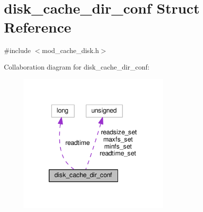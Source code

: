 \hypertarget{structdisk__cache__dir__conf}{}\section{disk\+\_\+cache\+\_\+dir\+\_\+conf Struct Reference}
\label{structdisk__cache__dir__conf}


{\ttfamily \#include $<$mod\+\_\+cache\+\_\+disk.\+h$>$}



Collaboration diagram for disk\+\_\+cache\+\_\+dir\+\_\+conf\+:
\nopagebreak
\begin{figure}[H]
\begin{center}
\leavevmode
\includegraphics[width=216pt]{structdisk__cache__dir__conf__coll__graph}
\end{center}
\end{figure}
